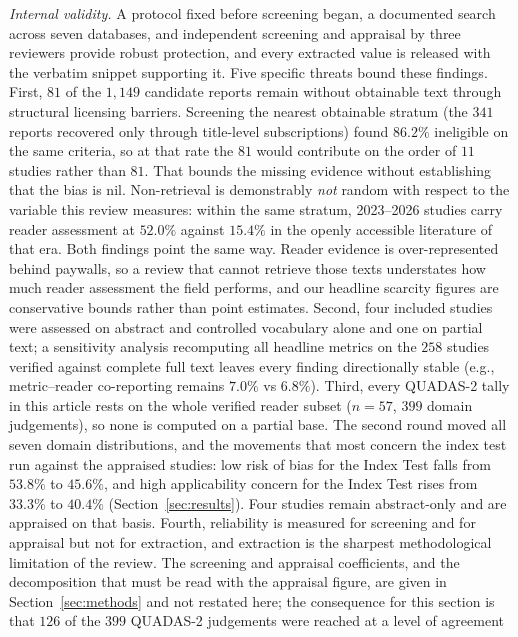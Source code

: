 \documentclass[review,authoryear]{elsarticle}
\begin{document}
\emph{Internal validity.} A protocol fixed before screening began, a documented search
across seven databases, and independent screening and appraisal by three reviewers provide
robust protection, and every extracted value is released with the verbatim snippet supporting
it. Five specific threats bound these findings.
First, $81$ of the $1{,}149$ candidate reports remain without obtainable text through
structural licensing barriers. Screening the nearest obtainable stratum (the $341$
reports recovered only through title-level subscriptions) found $86.2\%$ ineligible on
the same criteria, so at that rate the $81$ would contribute on the order of $11$ studies
rather than $81$. That bounds the missing evidence without establishing that the bias is
nil. Non-retrieval is demonstrably \emph{not} random with respect to the variable this
review measures: within the same stratum, 2023--2026 studies carry reader assessment at
$52.0\%$ against $15.4\%$ in the openly accessible literature of that era. Both findings
point the same way. Reader evidence is over-represented behind paywalls, so a review that
cannot retrieve those texts understates how much reader assessment the field performs, and
our headline scarcity figures are conservative bounds rather than point estimates.
Second, four included studies were assessed on abstract and controlled vocabulary alone and one on partial text; a sensitivity analysis recomputing all headline metrics on the $258$ studies verified against complete full text leaves every finding directionally stable (e.g., metric--reader co-reporting remains $7.0\%$ vs $6.8\%$).
Third, every QUADAS-2 tally in this article rests on the whole verified reader subset ($n=57$, $399$ domain judgements), so none is computed on a partial base. The second round moved all seven domain distributions, and the movements that most concern the index test run against the appraised studies: low risk of bias for the Index Test falls from $53.8\%$ to $45.6\%$, and high applicability concern for the Index Test rises from $33.3\%$ to $40.4\%$ (Section~\ref{sec:results}). Four studies remain abstract-only and are appraised on that basis.
Fourth, reliability is measured for screening and for appraisal but not for extraction,
and extraction is the sharpest methodological limitation of the review. The screening and
appraisal coefficients, and the decomposition that must be read with the appraisal figure,
are given in Section~\ref{sec:methods} and not restated here; the consequence for this
section is that $126$ of the $399$ QUADAS-2 judgements were reached at a level of agreement
\end{document}

